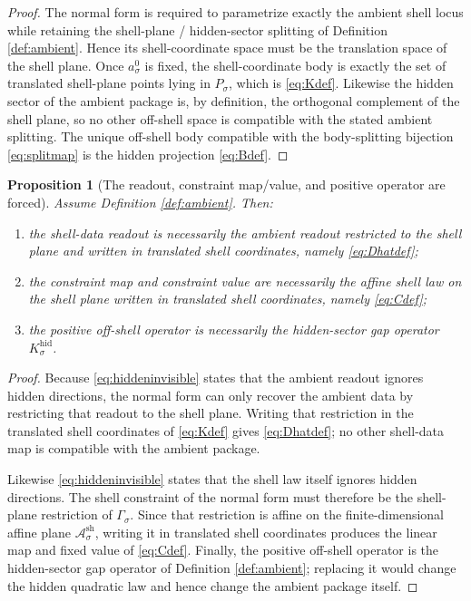 \documentclass[11pt]{article}
\newcommand{\AmbientBody}[1]{P_{#1}}
\newcommand{\AmbientShellLaw}[1]{\Gamma_{#1}}
\newcommand{\ShellAffine}[1]{\mathcal A_{#1}^{\mathrm{sh}}}
\newcommand{\HiddenOperator}[1]{K_{#1}^{\mathrm{hid}}}
\newcommand{\AmbientRef}[1]{a_{#1}^{0}}
\newtheorem{proposition}{Proposition}
\begin{document}
\begin{proof}
The normal form is required to parametrize exactly the ambient shell locus while retaining the shell-plane / hidden-sector splitting of Definition \ref{def:ambient}. Hence its shell-coordinate space must be the translation space of the shell plane. Once \(\AmbientRef{\sigma}\) is fixed, the shell-coordinate body is exactly the set of translated shell-plane points lying in \(\AmbientBody{\sigma}\), which is \eqref{eq:Kdef}. Likewise the hidden sector of the ambient package is, by definition, the orthogonal complement of the shell plane, so no other off-shell space is compatible with the stated ambient splitting. The unique off-shell body compatible with the body-splitting bijection \eqref{eq:splitmap} is the hidden projection \eqref{eq:Bdef}.
\end{proof}

\begin{proposition}[The readout, constraint map/value, and positive operator are forced]
\label{prop:maps}
Assume Definition \ref{def:ambient}. Then:
\begin{enumerate}
    \item the shell-data readout is necessarily the ambient readout restricted to the shell plane and written in translated shell coordinates, namely \eqref{eq:Dhatdef};
    \item the constraint map and constraint value are necessarily the affine shell law on the shell plane written in translated shell coordinates, namely \eqref{eq:Cdef};
    \item the positive off-shell operator is necessarily the hidden-sector gap operator \(\HiddenOperator{\sigma}\).
\end{enumerate}
\end{proposition}

\begin{proof}
Because \eqref{eq:hiddeninvisible} states that the ambient readout ignores hidden directions, the normal form can only recover the ambient data by restricting that readout to the shell plane. Writing that restriction in the translated shell coordinates of \eqref{eq:Kdef} gives \eqref{eq:Dhatdef}; no other shell-data map is compatible with the ambient package.

Likewise \eqref{eq:hiddeninvisible} states that the shell law itself ignores hidden directions. The shell constraint of the normal form must therefore be the shell-plane restriction of \(\AmbientShellLaw{\sigma}\). Since that restriction is affine on the finite-dimensional affine plane \(\ShellAffine{\sigma}\), writing it in translated shell coordinates produces the linear map and fixed value of \eqref{eq:Cdef}. Finally, the positive off-shell operator is the hidden-sector gap operator of Definition \ref{def:ambient}; replacing it would change the hidden quadratic law and hence change the ambient package itself.
\end{proof}
\end{document}

